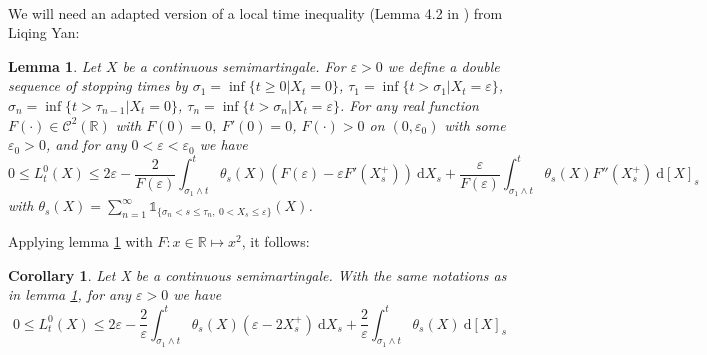 \documentclass[11pt]{enstaPRE}
\newtheorem{lem}[theo]{Lemma}
\newtheorem{cor}[theo]{Corollary}
\newcommand{\R}{\mathbb{R}}
\newcommand{\di}{\mathrm{d}}
\begin{document}
\paragraph{}
We will need an adapted version of a local time inequality (Lemma 4.2 in \cite{Yan}) from Liqing Yan:        
\begin{lem}\label{local}
    Let $X$ be a continuous semimartingale. For $\varepsilon>0$ we define a double sequence of stopping times by $\sigma_1 = \inf\{t\geq0 | X_t=0\}$, $\tau_1=\inf\{t>\sigma_1 | X_t=\varepsilon\}$, $\sigma_n = \inf\{t>\tau_{n-1}|X_t=0\}$, $\tau_n=\inf\{t>\sigma_n|X_t=\varepsilon\}$. For any real function $F(\cdot)\in\mathcal{C}^2(\R)$ with $F(0)=0,\ F'(0) = 0$, $F(\cdot) > 0$ on $(0,\varepsilon_0)$ with some $\varepsilon_0 > 0$, and for any $0<\varepsilon<\varepsilon_0$ we have
    \begin{equation*}
    0\leq L^0_t(X) \leq 2\varepsilon - \frac{2}{F(\varepsilon)}\int_{\sigma_1\wedge t}^t \theta_s(X) \left(F\left(\varepsilon\right) - \varepsilon F'\left(X_s^+\right)\right)\ \di X_s
    +\frac{\varepsilon}{F(\varepsilon)}\int_{\sigma_1\wedge t}^t \theta_s(X) F''(X_s^+)\ \di[X]_s
    \end{equation*}
    with $\theta_s(X) = \sum_{n=1}^\infty \mathds{1}_{\{\sigma_n< s\leq \tau_n,\ 0<X_s\leq \varepsilon\}}(X)$.
\end{lem}        
Applying lemma \ref{local} with $F:x\in\R \mapsto x^2$, it follows:
\begin{cor}\label{cor}
    Let X be a continuous semimartingale. With the same notations as in lemma \ref{local}, for any $\varepsilon>0$ we have
    \begin{equation}
    0\leq L^0_t(X) \leq 2\varepsilon - \frac{2}{\varepsilon}\int_{\sigma_1\wedge t}^t \theta_s(X) \left(\varepsilon - 2{X_s^+}\right)\ \di X_s
    +\frac{2}{\varepsilon}\int_{\sigma_1\wedge t}^t \theta_s(X) \ \di[X]_s
    \end{equation}
\end{cor}
\end{document}
